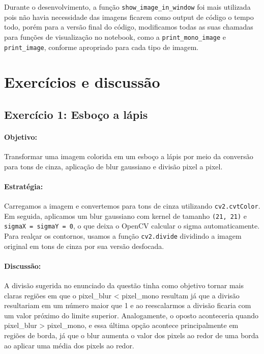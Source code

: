 \documentclass[12pt,a4paper]{report}
\begin{document}
Durante o desenvolvimento, a função \texttt{show\_image\_in\_window} foi mais utilizada pois não havia necessidade das imagens ficarem como output de código o tempo todo, porém para a versão final do código, modificamos todas as suas chamadas para funções de visualização no notebook, como a \texttt{print\_mono\_image} e \texttt{print\_image}, conforme apropriado para cada tipo de imagem.

\section{Exercícios e discussão}
\subsection{Exercício 1: Esboço a lápis}
\paragraph{Objetivo:} 
Transformar uma imagem colorida em um esboço a lápis por meio da conversão para tons de cinza, aplicação de blur gaussiano e divisão pixel a pixel.

\paragraph{Estratégia:} 
Carregamos a imagem e convertemos para tons de cinza utilizando \texttt{cv2.cvtColor}. Em seguida, aplicamos um blur gaussiano com kernel de tamanho \texttt{(21, 21)} e \texttt{sigmaX = sigmaY = 0}, o que deixa o OpenCV calcular o sigma automaticamente. Para realçar os contornos, usamos a função \texttt{cv2.divide} dividindo a imagem original em tons de cinza por sua versão desfocada.

\paragraph{Discussão:} 
A divisão sugerida no enunciado da questão tinha como objetivo tornar mais claras regiões em que o 
pixel\_blur < pixel\_mono resultam já que a divisão resultariam em um número maior que 1 e ao reescalarmos a divisão ficaria com um valor próximo do limite superior. Analogamente, o oposto aconteceria quando pixel\_blur > pixel\_mono, e essa última opção acontece principalmente em regiões de borda, já que o blur aumenta o valor dos pixels ao redor de uma borda ao aplicar uma média dos pixels ao redor.
\end{document}
